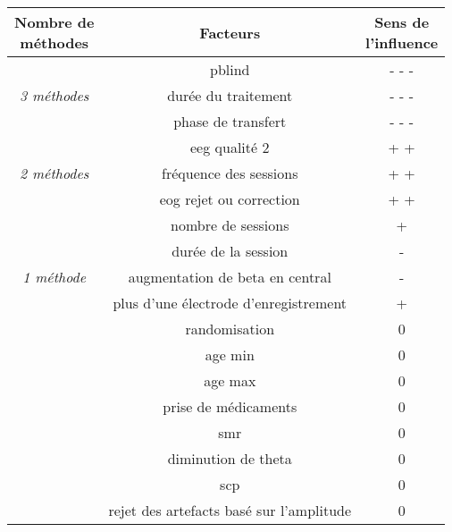 \begin{center}
\small 
\begin{tabular}{ ccc }
\toprule
\shortstack{Nombre de \\ méthodes}  & Facteurs & \shortstack{ Sens de \\ l'influence } \\
\midrule
\multirow{ 3}{*}{ \textit{3 méthodes} } & \gls{pblind} & - - - \\ 
& durée du traitement & - - - \\  
& phase de transfert & - - - \\  
\midrule
\multirow{ 3}{*}{ \textit{2 méthodes} } & \gls{eeg} qualité 2 & + + \\
& fréquence des sessions & + + \\
& \gls{eog} rejet ou correction & + + \\
\midrule
\multirow{ 5}{*}{ \textit{1 méthode} } & nombre de sessions & + \\
& durée de la session & - \\
& augmentation de beta en central & - \\
& plus d'une électrode d'enregistrement & + \\
\midrule
\multirow{ 8}{*}{ \textit{ Aucune méthode } } & randomisation & 0 \\ 
& age min & 0 \\ 
& age max & 0\\  
& prise de médicaments & 0 \\
& \gls{smr} & 0 \\
& diminution de theta & 0 \\
& \gls{scp} & 0 \\
& rejet des artefacts basé sur l'amplitude & 0 \\
\bottomrule
\end{tabular}
\end{center}